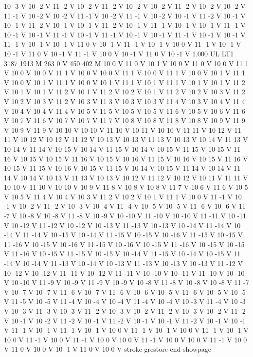 {10 -3 V
10 -2 V
11 -2 V
10 -2 V
11 -2 V
10 -2 V
10 -2 V
11 -2 V
10 -2 V
10 -2 V
11 -1 V
10 -2 V
10 -2 V
11 -1 V
10 -2 V
11 -1 V
10 -2 V
10 -1 V
11 -2 V
10 -1 V
10 -1 V
11 -2 V
10 -1 V
10 -1 V
11 -2 V
10 -1 V
11 -1 V
10 -1 V
10 -1 V
11 -1 V
10 -1 V
10 -1 V
11 -1 V
10 -1 V
11 -1 V
10 -1 V
10 -1 V
11 -1 V
10 -1 V
10 -1 V
11 -1 V
10 -1 V
10 -1 V
11 0 V
10 -1 V
11 -1 V
10 -1 V
10 0 V
11 -1 V
10 -1 V
10 -1 V
11 0 V
10 -1 V
11 -1 V
10 0 V
10 -1 V
11 0 V
10 -1 V
1.000 UL
LT1
3187 1913 M
263 0 V
450 402 M
10 0 V
11 0 V
10 1 V
10 0 V
11 0 V
10 0 V
11 1 V
10 0 V
10 0 V
11 1 V
10 0 V
10 0 V
11 1 V
10 0 V
11 1 V
10 0 V
10 1 V
11 1 V
10 0 V
10 1 V
11 1 V
10 0 V
10 1 V
11 1 V
10 1 V
11 1 V
10 1 V
10 1 V
11 2 V
10 1 V
10 1 V
11 2 V
10 1 V
11 2 V
10 2 V
10 1 V
11 2 V
10 2 V
10 3 V
11 2 V
10 2 V
10 3 V
11 2 V
10 3 V
11 3 V
10 3 V
10 3 V
11 4 V
10 3 V
10 4 V
11 4 V
10 4 V
10 4 V
11 4 V
10 5 V
11 5 V
10 5 V
10 5 V
11 6 V
10 5 V
10 6 V
11 6 V
10 7 V
11 6 V
10 7 V
10 7 V
11 7 V
10 8 V
10 8 V
11 8 V
10 8 V
10 9 V
11 9 V
10 9 V
11 9 V
10 10 V
10 10 V
11 10 V
10 11 V
10 10 V
11 11 V
10 12 V
11 11 V
10 12 V
10 12 V
11 12 V
10 13 V
10 13 V
11 13 V
10 13 V
10 14 V
11 13 V
10 14 V
11 14 V
10 15 V
10 14 V
11 15 V
10 14 V
10 15 V
11 15 V
10 15 V
11 16 V
10 15 V
10 15 V
11 16 V
10 15 V
10 16 V
11 15 V
10 16 V
10 15 V
11 16 V
10 15 V
11 15 V
10 16 V
10 15 V
11 15 V
10 14 V
10 15 V
11 14 V
10 14 V
11 14 V
10 14 V
10 13 V
11 13 V
10 13 V
10 12 V
11 12 V
10 12 V
10 11 V
11 11 V
10 10 V
11 10 V
10 10 V
10 9 V
11 8 V
10 8 V
10 8 V
11 7 V
10 6 V
11 6 V
10 5 V
10 5 V
11 4 V
10 4 V
10 3 V
11 2 V
10 2 V
10 1 V
11 1 V
10 0 V
11 -1 V
10 -1 V
10 -2 V
11 -2 V
10 -3 V
10 -4 V
11 -4 V
10 -5 V
10 -5 V
11 -6 V
10 -6 V
11 -7 V
10 -8 V
10 -8 V
11 -8 V
10 -9 V
10 -10 V
11 -10 V
10 -10 V
11 -11 V
10 -11 V
10 -12 V
11 -12 V
10 -12 V
10 -13 V
11 -13 V
10 -13 V
10 -14 V
11 -14 V
10 -14 V
11 -14 V
10 -15 V
10 -14 V
11 -15 V
10 -15 V
10 -16 V
11 -15 V
10 -15 V
11 -16 V
10 -15 V
10 -16 V
11 -15 V
10 -16 V
10 -15 V
11 -16 V
10 -15 V
10 -15 V
11 -16 V
10 -15 V
11 -15 V
10 -15 V
10 -14 V
11 -15 V
10 -14 V
10 -15 V
11 -14 V
10 -14 V
11 -13 V
10 -14 V
10 -13 V
11 -13 V
10 -13 V
10 -13 V
11 -12 V
10 -12 V
10 -12 V
11 -11 V
10 -12 V
11 -11 V
10 -10 V
10 -11 V
11 -10 V
10 -10 V
10 -10 V
11 -9 V
10 -9 V
11 -9 V
10 -9 V
10 -8 V
11 -8 V
10 -8 V
10 -8 V
11 -7 V
10 -7 V
10 -7 V
11 -6 V
10 -7 V
11 -6 V
10 -6 V
10 -5 V
11 -6 V
10 -5 V
10 -5 V
11 -5 V
10 -5 V
11 -4 V
10 -4 V
10 -4 V
11 -4 V
10 -4 V
10 -3 V
11 -4 V
10 -3 V
10 -3 V
11 -3 V
10 -3 V
11 -2 V
10 -3 V
10 -2 V
11 -2 V
10 -3 V
10 -2 V
11 -2 V
10 -1 V
10 -2 V
11 -2 V
10 -1 V
11 -2 V
10 -1 V
10 -1 V
11 -2 V
10 -1 V
10 -1 V
11 -1 V
10 -1 V
11 -1 V
10 -1 V
10 0 V
11 -1 V
10 -1 V
10 0 V
11 -1 V
10 -1 V
10 0 V
11 -1 V
10 0 V
11 -1 V
10 0 V
10 0 V
11 -1 V
10 0 V
10 0 V
11 -1 V
10 0 V
11 0 V
10 0 V
10 -1 V
11 0 V
10 0 V
stroke
grestore
end
showpage
}
